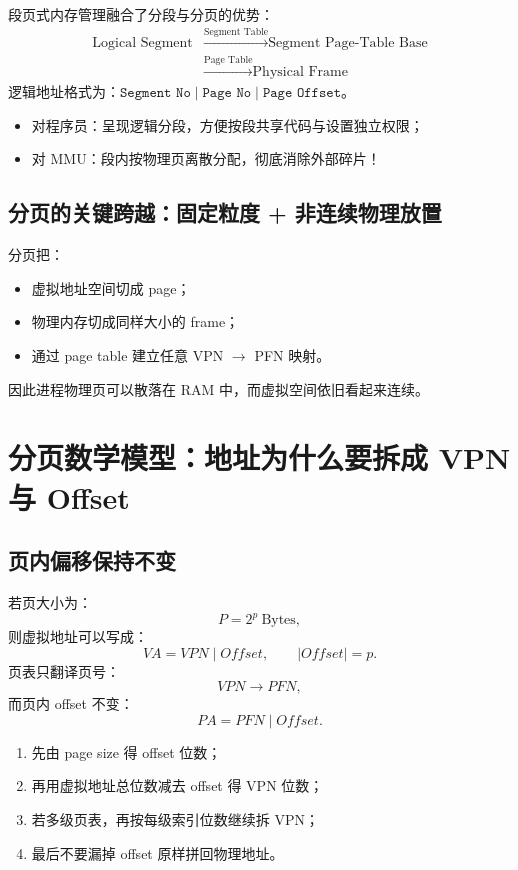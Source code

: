 \documentclass[11pt,a4paper]{ctexart}
\newcommand{\code}[1]{\texttt{#1}}
\begin{document}
段页式内存管理融合了分段与分页的优势：
\[
\boxed{
\begin{aligned}
\text{Logical Segment}
&\xrightarrow{\text{Segment Table}}\text{Segment Page-Table Base}\\
&\xrightarrow{\text{Page Table}}\text{Physical Frame}
\end{aligned}}
\]
逻辑地址格式为：$\code{Segment No} \mid \code{Page No} \mid \code{Page Offset}$。
\begin{itemize}
  \item 对程序员：呈现逻辑分段，方便按段共享代码与设置独立权限；
  \item 对 MMU：段内按物理页离散分配，彻底消除外部碎片！
\end{itemize}

\subsection{分页的关键跨越：固定粒度 + 非连续物理放置}
分页把：
\begin{itemize}
  \item 虚拟地址空间切成 page；
  \item 物理内存切成同样大小的 frame；
  \item 通过 page table 建立任意 VPN $\to$ PFN 映射。
\end{itemize}
因此进程物理页可以散落在 RAM 中，而虚拟空间依旧看起来连续。

\section{分页数学模型：地址为什么要拆成 VPN 与 Offset}

\subsection{页内偏移保持不变}
若页大小为：
\[
P=2^p\ \text{Bytes},
\]
则虚拟地址可以写成：
\[
\boxed{VA=VPN\mid Offset},\qquad |Offset|=p.
\]
页表只翻译页号：
\[
VPN\to PFN,
\]
而页内 offset 不变：
\[
\boxed{PA=PFN\mid Offset}.
\]

\begin{method}[地址题第一反应]
\begin{enumerate}
  \item 先由 page size 得 offset 位数；
  \item 再用虚拟地址总位数减去 offset 得 VPN 位数；
  \item 若多级页表，再按每级索引位数继续拆 VPN；
  \item 最后不要漏掉 offset 原样拼回物理地址。
\end{enumerate}
\end{method}
\end{document}
